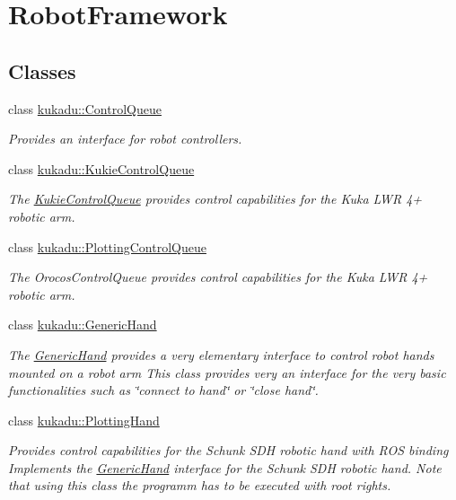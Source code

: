 \hypertarget{group__RobotFramework}{\section{Robot\-Framework}
\label{group__RobotFramework}
}
\subsection*{Classes}
\begin{DoxyCompactItemize}
\item 
class \hyperlink{classkukadu_1_1ControlQueue}{kukadu\-::\-Control\-Queue}
\begin{DoxyCompactList}\small\item\em Provides an interface for robot controllers. \end{DoxyCompactList}\item 
class \hyperlink{classkukadu_1_1KukieControlQueue}{kukadu\-::\-Kukie\-Control\-Queue}
\begin{DoxyCompactList}\small\item\em The \hyperlink{classkukadu_1_1KukieControlQueue}{Kukie\-Control\-Queue} provides control capabilities for the Kuka L\-W\-R 4+ robotic arm. \end{DoxyCompactList}\item 
class \hyperlink{classkukadu_1_1PlottingControlQueue}{kukadu\-::\-Plotting\-Control\-Queue}
\begin{DoxyCompactList}\small\item\em The Orocos\-Control\-Queue provides control capabilities for the Kuka L\-W\-R 4+ robotic arm. \end{DoxyCompactList}\item 
class \hyperlink{classkukadu_1_1GenericHand}{kukadu\-::\-Generic\-Hand}
\begin{DoxyCompactList}\small\item\em The \hyperlink{classkukadu_1_1GenericHand}{Generic\-Hand} provides a very elementary interface to control robot hands mounted on a robot arm This class provides very an interface for the very basic functionalities such as \char`\"{}connect to hand\char`\"{} or \char`\"{}close hand\char`\"{}. \end{DoxyCompactList}\item 
class \hyperlink{classkukadu_1_1PlottingHand}{kukadu\-::\-Plotting\-Hand}
\begin{DoxyCompactList}\small\item\em Provides control capabilities for the Schunk S\-D\-H robotic hand with R\-O\-S binding Implements the \hyperlink{classkukadu_1_1GenericHand}{Generic\-Hand} interface for the Schunk S\-D\-H robotic hand. Note that using this class the programm has to be executed with root rights. \end{DoxyCompactList}\item 

\end{DoxyCompactItemize}
